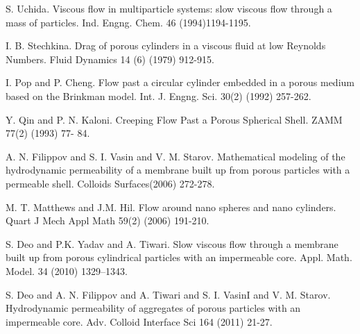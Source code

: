 \documentclass[article,A4,11pt]{llncs}%
\begin{document}

\begin{thebibliography}{10}
{\sc S. Uchida}. {Viscous flow in multiparticle systems: slow viscous flow through a mass of particles}. Ind. Engng. Chem. 46 (1994)1194-1195.

{\sc I. B. Stechkina}. {Drag of porous cylinders in a viscous fluid at low Reynolds Numbers}. Fluid Dynamics 14 (6) (1979)  912-915.

{\sc I. Pop and P. Cheng}. {Flow past a circular cylinder embedded in a porous medium based on the Brinkman model}. Int. J. Engng. Sci. 30(2) (1992)  257-262.

{\sc Y. Qin and P. N. Kaloni}. {Creeping Flow Past a Porous Spherical Shell}. ZAMM 77(2) (1993) 77- 84.

{\sc A. N. Filippov and S. I. Vasin and V. M. Starov}. {Mathematical modeling of the hydrodynamic permeability of a membrane built up from porous particles with a permeable shell}. Colloids  Surfaces(2006) 272-278.

{\sc M. T. Matthews and J.M. Hil}. {Flow around nano spheres and nano cylinders}. Quart J Mech Appl Math 59(2) (2006) 191-210.

{\sc S. Deo and P.K. Yadav and A. Tiwari}. {Slow viscous flow through a membrane built up from porous cylindrical particles with an impermeable core}. Appl. Math. Model. 34 (2010) 1329–1343.

{\sc S. Deo and A. N. Filippov and A. Tiwari and S. I. VasinI and V. M. Starov}. {Hydrodynamic permeability of aggregates of porous particles with an impermeable core}. Adv. Colloid Interface Sci 164 (2011) 21-27.
\end{thebibliography}
\end{document}
